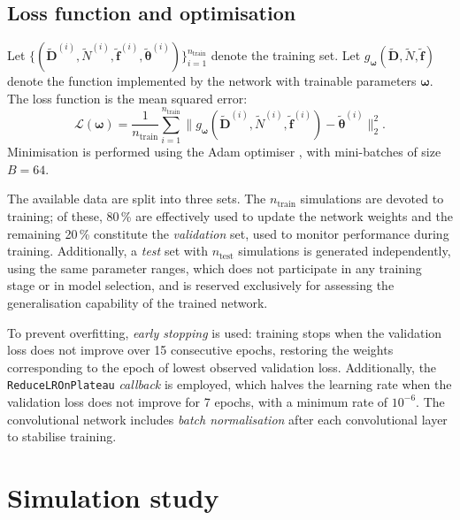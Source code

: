 \documentclass[a4paper,fleqn]{cas-sc}
\numberwithin{equation}{section}
\begin{document}
\subsection{Loss function and optimisation}
\label{sec:loss}

Let $\{(\tilde{\mathbf{D}}^{(i)}, \tilde{N}^{(i)},
\tilde{\mathbf{f}}^{(i)},
\tilde{\boldsymbol{\theta}}^{(i)})\}_{i=1}^{n_{\mathrm{train}}}$
denote the training set. Let
$g_{\boldsymbol{\omega}}(\tilde{\mathbf{D}}, \tilde{N},
\tilde{\mathbf{f}})$ denote the function implemented by the network
with trainable parameters $\boldsymbol{\omega}$. The loss function is
the mean squared error:
\begin{equation}
    \mathcal{L}(\boldsymbol{\omega}) = \frac{1}{n_{\mathrm{train}}}
    \sum_{i=1}^{n_{\mathrm{train}}}
    \bigl\|g_{\boldsymbol{\omega}}(\tilde{\mathbf{D}}^{(i)},
    \tilde{N}^{(i)}, \tilde{\mathbf{f}}^{(i)})
    - \tilde{\boldsymbol{\theta}}^{(i)}\bigr\|_2^2.
    \label{eq:loss}
\end{equation}
Minimisation is performed using the Adam optimiser \citep{adam}, with
mini-batches of size $B=64$.

The available data are split into three sets. The $n_{\mathrm{train}}$
simulations are devoted to training; of these, 80\,\% are effectively
used to update the network weights and the remaining 20\,\% constitute
the \emph{validation} set, used to monitor performance during
training. Additionally, a \emph{test} set with $n_{\mathrm{test}}$
simulations is generated independently, using the same parameter
ranges, which does not participate in any training stage or in model
selection, and is reserved exclusively for assessing the
generalisation capability of the trained network.

To prevent overfitting, \emph{early stopping} is used: training stops
when the validation loss does not improve over 15 consecutive epochs,
restoring the weights corresponding to the epoch of lowest observed
validation loss. Additionally, the \texttt{ReduceLROnPlateau}
\emph{callback} is employed, which halves the learning rate when the
validation loss does not improve for 7 epochs, with a minimum rate of
$10^{-6}$. The convolutional network includes \emph{batch
normalisation} after each convolutional layer to stabilise training.

\section{Simulation study}
\label{sec:simulacion}
\end{document}
